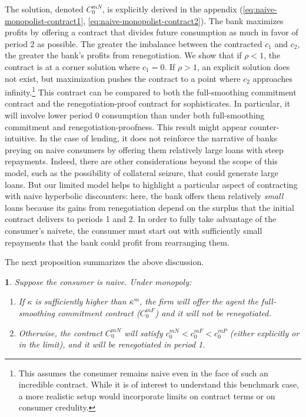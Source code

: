 \documentclass[11pt,english]{article}
\theoremstyle{plain}
\newtheorem{prop}{\protect\propositionname}
\theoremstyle{definition}
\providecommand{\propositionname}{Proposition}
\begin{document}
The solution, denoted $C_{0}^{mN}$, is explicitly derived
in the appendix (\ref{eq:naive-monopolist-contract1}, \ref{eq:naive-monopolist-contract2}).
The bank maximizes profits by offering a contract that divides future
consumption as much in favor of period 2 as possible. The greater
the imbalance between the contracted $c_{1}$ and $c_{2}$, the greater
the bank's profits from renegotiation. We show that if $\rho<1$,
the contract is at a corner solution where $c_{1}=0$. If $\rho>1$,
an explicit solution does not exist, but maximization pushes the contract
to a point where $c_{2}$ approaches infinity.\footnote{This assumes the consumer remains naive even in the face of such an incredible contract. While it is of interest to understand this benchmark case, a more realistic setup would incorporate limits on contract terms or on consumer credulity.} This contract can be compared to both the full-smoothing commitment
contract and the renegotiation-proof contract for sophisticates. In
particular, it will involve lower period 0 consumption than under
both full-smoothing commitment and renegotiation-proofness. This result
might appear counter-intuitive. In the case of lending, it does not
reinforce the narrative of banks preying on naive consumers by offering
them relatively large loans with steep repayments. Indeed, there are
other considerations beyond the scope of this model, such as the possibility
of collateral seizure, that could generate large loans. But our limited
model helps to highlight a particular aspect of contracting with naive
hyperbolic discounters: here, the bank offers them relatively \emph{small}
loans because its gains from renegotiation depend on the surplus that
the initial contract delivers to periods 1 and 2. In order to fully
take advantage of the consumer's naivete, the consumer must start
out with sufficiently small repayments that the bank could profit
from rearranging them.

The next proposition summarizes the above discussion. 
\begin{prop}
Suppose the consumer is naive. Under monopoly:
\begin{enumerate} [label=\alph*)]
\item If $\kappa$ is sufficiently higher than $\bar{\kappa}^{m}$,
the firm will offer the agent the full-smoothing commitment contract
($C_{0}^{mF}$) and it will not be renegotiated.

\item Otherwise, the contract $C_{0}^{mN}$ will satisfy $c_{0}^{mN}<c_{0}^{mF}<c_{0}^{mP}$
(either explicitly or in the limit), and it will be renegotiated in
period 1. 
\end{enumerate}
\end{prop}
\end{document}
